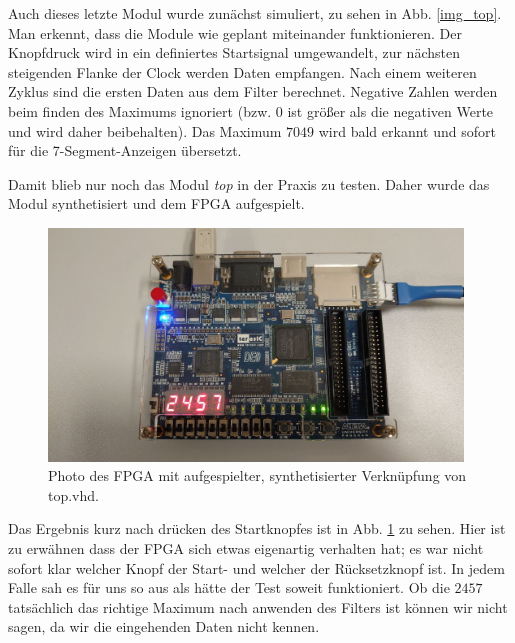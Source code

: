 Auch dieses letzte Modul wurde zunächst simuliert, zu sehen in Abb. \ref{img_top}.
Man erkennt, dass die Module wie geplant miteinander funktionieren.
Der Knopfdruck wird in ein definiertes Startsignal umgewandelt, zur nächsten steigenden Flanke der Clock werden Daten empfangen.
Nach einem weiteren Zyklus sind die ersten Daten aus dem Filter berechnet.
Negative Zahlen werden beim finden des Maximums ignoriert (bzw. $0$ ist größer als die negativen Werte und wird daher beibehalten).
Das Maximum $7049$ wird bald erkannt und sofort für die 7-Segment-Anzeigen übersetzt.

Damit blieb nur noch das Modul \textit{top} in der Praxis zu testen.
Daher wurde das Modul synthetisiert und dem FPGA aufgespielt.

\begin{figure}[ht]
	\centering
    \includegraphics[width=0.98\textwidth]{../Daten/Photo_FPGA_top.png}
	\caption{Photo des FPGA mit aufgespielter, synthetisierter Verknüpfung von top.vhd.}
	\label{photo_top}
\end{figure}

Das Ergebnis kurz nach drücken des Startknopfes ist in Abb. \ref{photo_top} zu sehen.
Hier ist zu erwähnen dass der FPGA sich etwas eigenartig verhalten hat; es war nicht sofort klar welcher Knopf der Start- und welcher der Rücksetzknopf ist.
In jedem Falle sah es für uns so aus als hätte der Test soweit funktioniert.
Ob die $2457$ tatsächlich das richtige Maximum nach anwenden des Filters ist können wir nicht sagen, da wir die eingehenden Daten nicht kennen.

